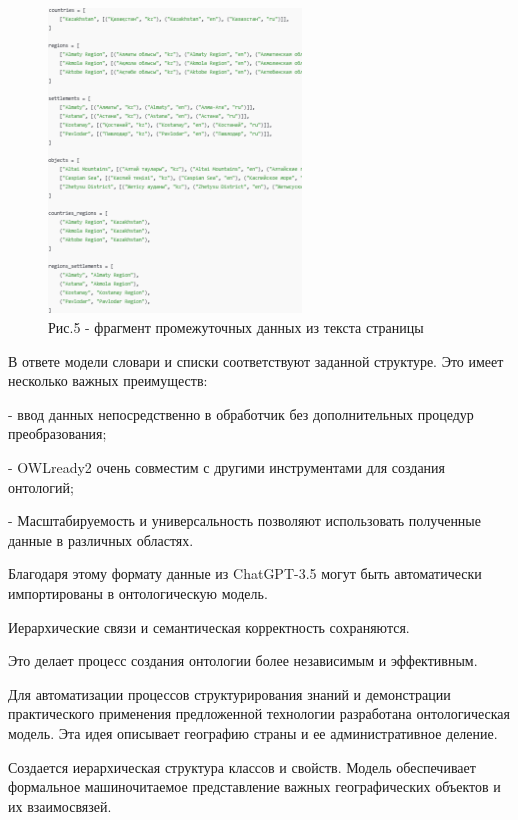 \begin{figure}[H]
	\centering
	\includegraphics[width=0.6\textwidth]{media/ict2/image153}
	\caption*{Рис.5 - фрагмент промежуточных данных из текста страницы}
\end{figure}

\begin{multicols}{2}
В ответе модели словари и списки соответствуют заданной структуре. Это
имеет несколько важных преимуществ:

- ввод данных непосредственно в обработчик без дополнительных процедур
преобразования;

- OWLready2 очень совместим с другими инструментами для создания
онтологий;

- Масштабируемость и универсальность позволяют использовать полученные
данные в различных областях.

Благодаря этому формату данные из ChatGPT-3.5 могут быть автоматически
импортированы в онтологическую модель.

Иерархические связи и семантическая корректность сохраняются.

Это делает процесс создания онтологии более независимым и эффективным.

Для автоматизации процессов структурирования знаний и демонстрации
практического применения предложенной технологии разработана
онтологическая модель. Эта идея описывает географию страны и ее
административное деление.

Создается иерархическая структура классов и свойств. Модель обеспечивает
формальное машиночитаемое представление важных географических объектов и
их взаимосвязей.
\end{multicols}

